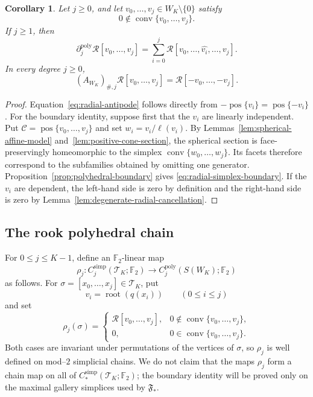 \documentclass[reqno,12pt]{amsart}
\newtheorem{corollary}[theorem]{Corollary}
\theoremstyle{definition}
\DeclareMathOperator{\conv}{conv}
\DeclareMathOperator{\pos}{pos}
\newcommand{\F}{\mathbb F_2}
\begin{document}
\begin{corollary}
\label{coro:radial-simplex-identities}
Let \(j\geq0\), and let
\(v_0,\ldots,v_j\in W_K\setminus\{0\}\) satisfy
\[
 0\notin\conv\{v_0,\ldots,v_j\}.
\]
If \(j\geq1\), then
\begin{equation}\label{eq:radial-simplex-boundary}
 \partial_j^{\mathrm{poly}}\mathcal R[v_0,\ldots,v_j]
 =\sum_{i=0}^j
   \mathcal R[v_0,\ldots,\widehat{v_i},\ldots,v_j].
\end{equation}
In every degree \(j\geq0\),
\begin{equation}\label{eq:radial-antipode}
 (A_{W_K})_{\#,j}\mathcal R[v_0,\ldots,v_j]
 =\mathcal R[-v_0,\ldots,-v_j].
\end{equation}
\end{corollary}

\begin{proof}
Equation~\eqref{eq:radial-antipode} follows directly from
\(-\pos\{v_i\}=\pos\{-v_i\}\).  For the boundary identity, suppose
first that the \(v_i\) are linearly independent.  Put
\(\mathcal C=\pos\{v_0,\ldots,v_j\}\) and set
\(w_i=v_i/\ell(v_i)\).  By
Lemmas~\ref{lem:spherical-affine-model}
and~\ref{lem:positive-cone-section}, the spherical section is
face-preservingly homeomorphic to the simplex
\(\conv\{w_0,\ldots,w_j\}\).  Its facets therefore correspond to the
subfamilies obtained by omitting one generator.
Proposition~\ref{prop:polyhedral-boundary} gives
\eqref{eq:radial-simplex-boundary}.  If the \(v_i\) are
dependent, the left-hand side is zero by definition and the right-hand
side is zero by
Lemma~\ref{lem:degenerate-radial-cancellation}.
\end{proof}

\subsection{The rook polyhedral chain}

For \(0\leq j\leq K-1\), define an \(\F\)-linear map
\[
 \rho_j:
 C_j^{\mathrm{simp}}(\mathcal T_K;\F)
 \longrightarrow C_j^{\mathrm{poly}}(S(W_K);\F)
\]
as follows.  For
\(\sigma=[x_0,\ldots,x_j]\in\mathcal T_K\), put
\[
 v_i=\operatorname{root}(q(x_i))\qquad(0\leq i\leq j)
\]
and set
\[
 \rho_j(\sigma)=
 \begin{cases}
  \mathcal R[v_0,\ldots,v_j],&
      0\notin\conv\{v_0,\ldots,v_j\},\\
 0,&0\in\conv\{v_0,\ldots,v_j\}.
 \end{cases}
\]
Both cases are invariant under permutations of the vertices of
\(\sigma\), so \(\rho_j\) is well defined on mod--\(2\) simplicial
chains.  We do not claim that the maps \(\rho_j\) form a chain map on
all of \(C_*^{\mathrm{simp}}(\mathcal T_K;\F)\); the boundary identity
will be proved only on the maximal gallery simplices used by
\(\mathfrak F_*\).
\end{document}
